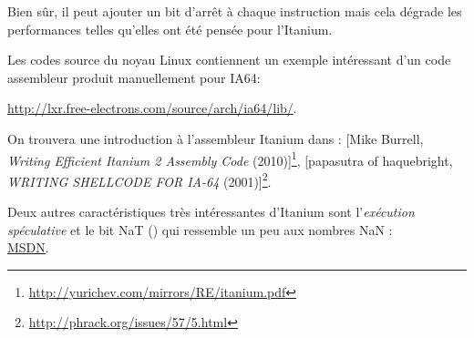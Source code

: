 Bien sûr, il peut ajouter un bit d'arrêt à chaque instruction mais cela dégrade les performances
telles qu'elles ont été pensée pour l'Itanium.

Les codes source du noyau Linux contiennent un exemple intéressant d'un code assembleur produit
manuellement pour \ac{IA64}:

\url{http://lxr.free-electrons.com/source/arch/ia64/lib/}.

On trouvera une introduction à l'assembleur Itanium dans :
[Mike Burrell, \emph{Writing Efficient Itanium 2 Assembly Code} (2010)]\footnote{\AlsoAvailableAs \url{http://yurichev.com/mirrors/RE/itanium.pdf}},
[papasutra of haquebright, \emph{WRITING SHELLCODE FOR IA-64} (2001)]\footnote{\AlsoAvailableAs \url{http://phrack.org/issues/57/5.html}}.

Deux autres caractéristiques très intéressantes d'Itanium sont l'\emph{exécution spéculative}
et le bit NaT () qui ressemble un peu aux nombres \gls{NaN} : \\
\href{http://blogs.msdn.com/b/oldnewthing/archive/2004/01/19/60162.aspx}{MSDN}.

